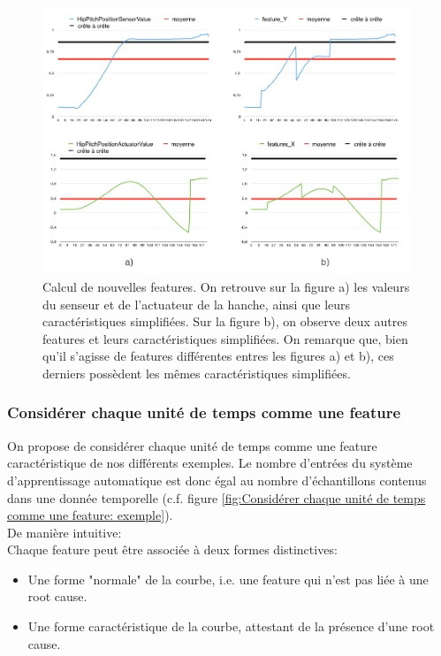 \begin{figure}[h]
	\centering\includegraphics[height=8cm]{images/caracteristiques_simples_2.png}
	\caption[Comparaison de deux caractéristiques]{Calcul de nouvelles features. On retrouve sur la figure a) les valeurs du senseur et de l'actuateur de la hanche, ainsi que leurs caractéristiques simplifiées. Sur la figure b), on observe deux autres features et leurs caractéristiques simplifiées. On remarque que, bien qu'il s'agisse de features différentes entres les figures a) et b), ces derniers possèdent les mêmes caractéristiques simplifiées.}
	\label{fig:Comparaison de deux caractéristiques}
\end{figure}

\subsubsection{Considérer chaque unité de temps comme une feature}
\label{Automatisation du processus d'investigation: Reconnaissance de motifs: Différentes approches étudiées: Considérer chaque unité de temps comme une feature}
On propose de considérer chaque unité de temps comme une feature caractéristique de nos différents exemples. Le nombre d'entrées du système d'apprentissage automatique est donc égal au nombre d'échantillons contenus dans une donnée temporelle (c.f. figure \ref{fig:Considérer chaque unité de temps comme une feature: exemple}). \\
De manière intuitive: \\
Chaque feature peut être associée à deux formes distinctives: 
\begin{itemize}
	\item Une forme "normale" de la courbe, i.e. une feature qui n'est pas liée à une root cause.  
	\item Une forme caractéristique de la courbe, attestant de la présence d'une root cause. 
\end{itemize}

